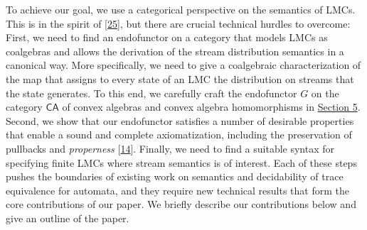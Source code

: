 \par\medskip
\hypertarget{html:S1.p5}{} To achieve our goal, we use a categorical perspective on the semantics of LMCs. This is in the spirit of [\hyperlink{html:bib.bib25}{25}], but there are crucial technical hurdles to overcome: First, we need to find an endofunctor on a category that models LMCs as coalgebras and allows the derivation of the stream distribution semantics in a canonical way. More specifically, we need to give a coalgebraic characterization of the map that assigns to every state of an LMC the distribution on streams that the state generates. To this end, we carefully craft the endofunctor %
\hypertarget{html:S1.p5.m1}{}\({G}\) on the category %
\hypertarget{html:S1.p5.m2}{}\({\mathsf{CA}}\) of convex algebras and convex algebra homomorphisms in \hyperlink{html:S5}{Section 5}. Second, we show that our endofunctor satisfies a number of desirable properties that enable a sound and complete axiomatization, including the preservation of pullbacks and \emph{properness} [\hyperlink{html:bib.bib14}{14}]. Finally, we need to find a suitable syntax for specifying finite LMCs where stream semantics is of interest. Each of these steps pushes the boundaries of existing work on semantics and decidability of trace equivalence for automata, and they require new technical results that form the core contributions of our paper. We briefly describe our contributions below and give an outline of the paper.
\par\medskip
\hypertarget{html:S1.I1}{}
